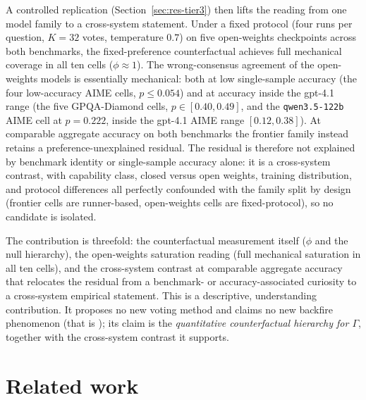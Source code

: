 \documentclass[a4paper,fleqn]{cas-sc}
\newcommand{\agreementIndex}{\Gamma}
\begin{document}
A controlled replication (Section~\ref{sec:res-tier3}) then lifts the
reading from one model family to a cross-system statement. Under a fixed
protocol (four runs per question, $K=32$ votes, temperature $0.7$) on
five open-weights checkpoints across both benchmarks, the
fixed-preference counterfactual achieves full mechanical
coverage in all ten cells ($\phi\approx1$). The
wrong-consensus agreement of the open-weights models is essentially
mechanical: both at low single-sample accuracy (the four low-accuracy AIME cells,
$p\le0.054$) and at accuracy inside the gpt-4.1 range (the five GPQA-Diamond
cells, $p\in[0.40,0.49]$, and the \texttt{qwen3.5-122b} AIME cell at
$p=0.222$, inside the gpt-4.1 AIME range $[0.12,0.38]$). At comparable
aggregate accuracy on both benchmarks the frontier family instead retains a
preference-unexplained residual. The residual is therefore not
explained by benchmark identity or single-sample accuracy alone: it is a cross-system
contrast, with capability class, closed versus open weights, training
distribution, and protocol differences all perfectly confounded with the
family split by design (frontier cells are runner-based, open-weights
cells are fixed-protocol), so no candidate is isolated.

The contribution is threefold: the counterfactual measurement itself
($\phi$ and the null hierarchy), the open-weights saturation reading
(full mechanical saturation in all ten cells), and the
cross-system contrast at comparable aggregate accuracy that relocates the residual
from a benchmark- or accuracy-associated curiosity to a cross-system
empirical statement. This is a descriptive, understanding
contribution. It proposes no
new voting method and claims no new backfire phenomenon (that is
\cite{bahuguna2026when}); its claim is the \emph{quantitative
counterfactual hierarchy for $\agreementIndex$}, together with the cross-system
contrast it supports.

\section{Related work}
\label{sec:related}
\end{document}
